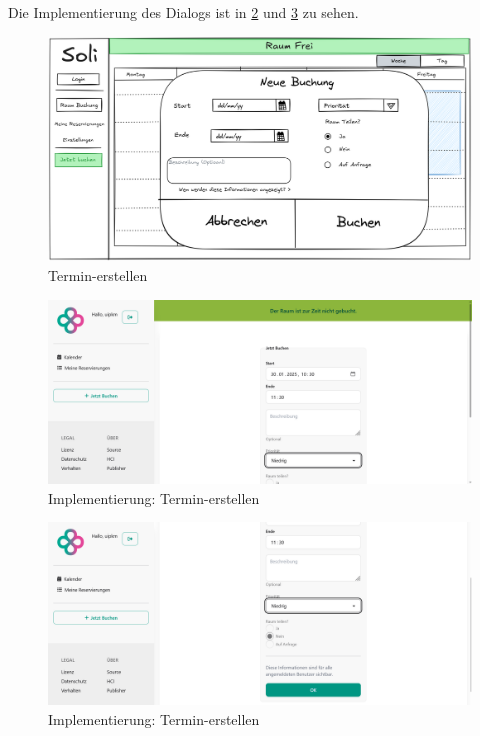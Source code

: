 Die Implementierung des Dialogs ist in \ref{fig:impl-buchung1} und \ref{fig:impl-buchung2} zu sehen.

\begin{figure}[ht]
    \centering
    \includegraphics[width=\textwidth]{figures/mockup/bookings_create_form}
    \caption{Termin-erstellen}
    \label{fig:buchung}
\end{figure}
\pagebreak

\begin{figure}[ht]
    \centering
    \includegraphics[width=\textwidth]{figures/impl-views/book1_light}
    \caption{Implementierung: Termin-erstellen}
    \label{fig:impl-buchung1}
\end{figure}

\begin{figure}[ht]
    \centering
    \includegraphics[width=\textwidth]{figures/impl-views/book2_light}
    \caption{Implementierung: Termin-erstellen}
    \label{fig:impl-buchung2}
\end{figure}
\clearpage

